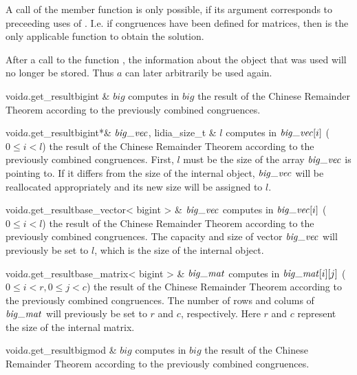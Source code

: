 A call of the  member function is only possible, if its argument corresponds
to preceeding uses of .  I.e. if congruences have been defined for matrices, then
 is the only applicable function to obtain the solution.

After a call to the function , the information about the object that was used
will no longer be stored.  Thus $a$ can later arbitrarily be used again.

\begin{fcode}{void}{$a$.get_result}{bigint & $\mathit{big}$}
  computes in $\mathit{big}$ the result of the Chinese Remainder Theorem according to the
  previously combined congruences.
\end{fcode}

\begin{fcode}{void}{$a$.get_result}{bigint*& $\bigvec$, lidia_size_t & $l$}
  computes in $\bigvec[i]$ ($0 \leq i < l$) the result of the Chinese Remainder Theorem
  according to the previously combined congruences.  First, $l$ must be the size of the array
  $\bigvec$ is pointing to.  If it differs from the size of the internal object, $\bigvec$ will
  be reallocated appropriately and its new size will be assigned to $l$.
\end{fcode}

\begin{fcode}{void}{$a$.get_result}{base_vector< bigint > & $\bigvec$}
  computes in $\bigvec[i]$ ($0 \leq i < l$) the result of the Chinese Remainder Theorem
  according to the previously combined congruences.  The capacity and size of vector $\bigvec$
  will previously be set to $l$, which is the size of the internal object.
\end{fcode}

\begin{fcode}{void}{$a$.get_result}{base_matrix< bigint > & $\bigmat$}
  computes in $\bigmat[i][j]$ ($0 \leq i < r, 0 \leq j < c$) the result of the Chinese Remainder
  Theorem according to the previously combined congruences.  The number of rows and colums of
  $\bigmat$ will previously be set to $r$ and $c$, respectively.  Here $r$ and $c$ represent the
  size of the internal matrix.
\end{fcode}

\begin{fcode}{void}{$a$.get_result}{bigmod & $\mathit{big}$}
  computes in $\mathit{big}$ the result of the Chinese Remainder Theorem according to the
  previously combined congruences.
\end{fcode}

